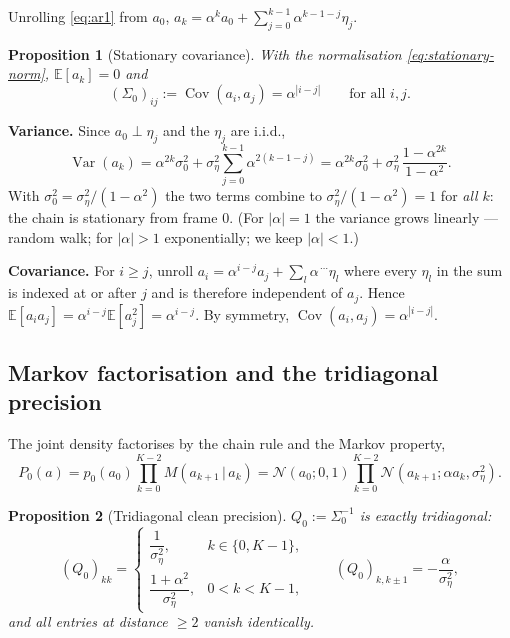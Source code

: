 \documentclass[11pt]{article}
\newtheorem{proposition}{Proposition}
\theoremstyle{definition}
\newcommand{\N}{\mathcal{N}}
\newcommand{\E}{\mathbb{E}}
\newcommand{\Sig}{\Sigma}
\newcommand{\given}{\,|\,}
\DeclareMathOperator{\Cov}{Cov}
\DeclareMathOperator{\Var}{Var}
\begin{document}
Unrolling \eqref{eq:ar1} from $a_0$,
$a_k=\alpha^k a_0+\sum_{j=0}^{k-1}\alpha^{k-1-j}\eta_j$.

\begin{proposition}[Stationary covariance]\label{prop:statcov}
With the normalisation \eqref{eq:stationary-norm}, $\E[a_k]=0$ and
\begin{equation}\label{eq:Sigma0}
  (\Sig_0)_{ij}:=\Cov(a_i,a_j)=\alpha^{|i-j|}\qquad\text{for all }i,j .
\end{equation}
\end{proposition}

\begin{derivation}
\textbf{Variance.} Since $a_0\perp\eta_j$ and the $\eta_j$ are i.i.d.,
\[
  \Var(a_k)=\alpha^{2k}\sigma_0^2
   +\sigma_\eta^2\sum_{j=0}^{k-1}\alpha^{2(k-1-j)}
   =\alpha^{2k}\sigma_0^2+\sigma_\eta^2\,\frac{1-\alpha^{2k}}{1-\alpha^2}.
\]
With $\sigma_0^2=\sigma_\eta^2/(1-\alpha^2)$ the two terms combine to
$\sigma_\eta^2/(1-\alpha^2)=1$ for \emph{all} $k$: the chain is stationary from
frame $0$. (For $|\alpha|=1$ the variance grows linearly --- random walk; for
$|\alpha|>1$ exponentially; we keep $|\alpha|<1$.)

\textbf{Covariance.} For $i\ge j$, unroll $a_i=\alpha^{i-j}a_j+\sum_{l}
\alpha^{\,\cdots}\eta_l$ where every $\eta_l$ in the sum is indexed at or
after $j$ and is therefore independent of $a_j$. Hence
$\E[a_ia_j]=\alpha^{i-j}\E[a_j^2]=\alpha^{i-j}$. By symmetry,
$\Cov(a_i,a_j)=\alpha^{|i-j|}$.
\end{derivation}

\subsection{Markov factorisation and the tridiagonal precision}

The joint density factorises by the chain rule and the Markov property,
\begin{equation}\label{eq:P0}
  P_0(a)=p_0(a_0)\prod_{k=0}^{K-2}M(a_{k+1}\given a_k)
        =\N(a_0;0,1)\prod_{k=0}^{K-2}\N(a_{k+1};\alpha a_k,\sigma_\eta^2).
\end{equation}

\begin{proposition}[Tridiagonal clean precision]\label{prop:Q0}
$Q_0:=\Sig_0^{-1}$ is exactly tridiagonal:
\[
  (Q_0)_{kk}=\begin{cases}
     \dfrac{1}{\sigma_\eta^2}, & k\in\{0,K-1\},\\[6pt]
     \dfrac{1+\alpha^2}{\sigma_\eta^2}, & 0<k<K-1,
  \end{cases}
  \qquad
  (Q_0)_{k,k\pm1}=-\frac{\alpha}{\sigma_\eta^2},
\]
and all entries at distance $\ge2$ vanish identically.
\end{proposition}
\end{document}
